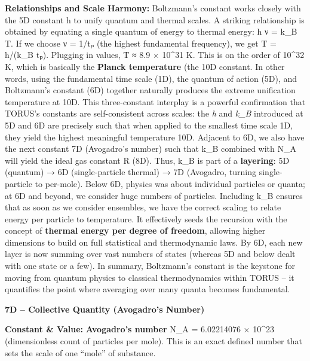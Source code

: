 \textbf{Relationships and Scale Harmony:} Boltzmann's constant works
closely with the 5D constant h to unify quantum and thermal scales. A
striking relationship is obtained by equating a single quantum of energy
to thermal energy: h ν = k\_B T. If we choose ν = 1/tₚ (the highest
fundamental frequency), we get T = h/(k\_B tₚ). Plugging in values, T ≈
8.9 × 10\^{}31 K​. This is on the order of 10\^{}32 K, which is
basically the \textbf{Planck temperature} (the 10D constant. In other
words, using the fundamental time scale (1D), the quantum of action
(5D), and Boltzmann's constant (6D) together naturally produces the
extreme unification temperature at 10D. This three-constant interplay is
a powerful confirmation that TORUS's constants are self-consistent
across scales: the \emph{h} and \emph{k\_B} introduced at 5D and 6D are
precisely such that when applied to the smallest time scale 1D, they
yield the highest meaningful temperature 10D​. Adjacent to 6D, we also
have the next constant 7D (Avogadro's number) such that k\_B combined
with N\_A will yield the ideal gas constant R (8D)​. Thus, k\_B is part
of a \textbf{layering}: 5D (quantum) → 6D (single-particle thermal) → 7D
(Avogadro, turning single-particle to per-mole). Below 6D, physics was
about individual particles or quanta; at 6D and beyond, we consider huge
numbers of particles. Including k\_B ensures that as soon as we consider
ensembles, we have the correct scaling to relate energy per particle to
temperature. It effectively seeds the recursion with the concept of
\textbf{thermal energy per degree of freedom}, allowing higher
dimensions to build on full statistical and thermodynamic laws. By 6D,
each new layer is now summing over vast numbers of states (whereas 5D
and below dealt with one state or a few). In summary, Boltzmann's
constant is the keystone for moving from quantum physics to classical
thermodynamics within TORUS -- it quantifies the point where averaging
over many quanta becomes fundamental.

\textbf{7D -- Collective Quantity (Avogadro's Number)}

\textbf{Constant \& Value:} \textbf{Avogadro's number} N\_A = 6.02214076
× 10\^{}23 (dimensionless count of particles per mole)​. This is an
exact defined number that sets the scale of one ``mole'' of substance.

